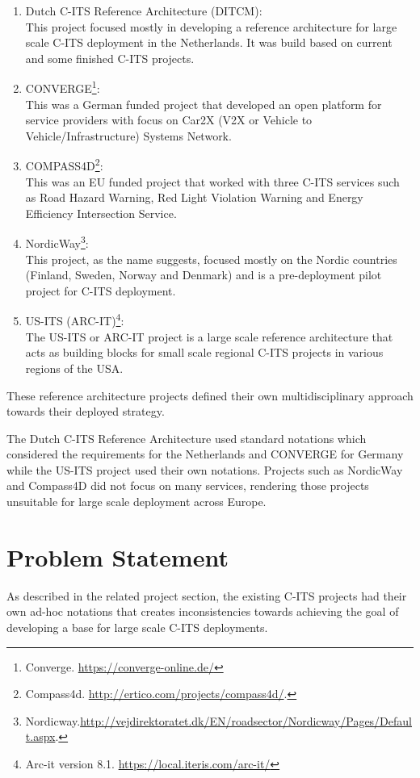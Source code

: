 \documentclass[conference]{IEEEtran}
\begin{document}
\begin{enumerate}
	\item Dutch C-ITS Reference Architecture (DITCM)\cite{ditcm}\cite{ditcmits}:\\
		This project focused mostly in developing a reference architecture for large scale C-ITS deployment in the Netherlands. It was build based on current and some finished C-ITS projects.
	\item CONVERGE\footnote{\label{converge}Converge. \url{https://converge-online.de/}}: \\
		This was a German funded project that developed an open platform for service providers with focus on Car2X (V2X or Vehicle to Vehicle/Infrastructure) Systems Network.
	\item COMPASS4D\footnote{\label{compass4d}Compass4d. \url{http://ertico.com/projects/compass4d/}.}:\\
	This was an EU funded project that worked with three C-ITS services such as Road Hazard Warning, Red Light Violation Warning and Energy Efficiency Intersection Service.
	\item NordicWay\footnote{\label{nordicway}Nordicway.\url{http://vejdirektoratet.dk/EN/roadsector/Nordicway/Pages/Default.aspx}.}:\\
	This project, as the name suggests, focused mostly on the Nordic countries (Finland, Sweden, Norway and Denmark) and is a pre-deployment pilot project for  C-ITS deployment.
	\item US-ITS (ARC-IT)\footnote{\label{arcit}Arc-it version 8.1. \url{https://local.iteris.com/arc-it/}}:\\
	The US-ITS or ARC-IT project is a large scale reference architecture that acts as building blocks for small scale regional C-ITS projects in various regions of the USA.

\end{enumerate}

These reference architecture projects defined their own multidisciplinary approach towards their deployed strategy. 

The Dutch C-ITS Reference Architecture used standard notations which considered the requirements for the Netherlands and CONVERGE  for Germany while the US-ITS project used their own notations. Projects such as NordicWay and Compass4D did not focus on many services, rendering those projects unsuitable for large scale deployment across Europe.

\section{Problem Statement}
As described in the related project section, 
the existing C-ITS projects had their own ad-hoc notations that creates inconsistencies towards achieving the goal of developing a base for large scale C-ITS deployments.
\end{document}
